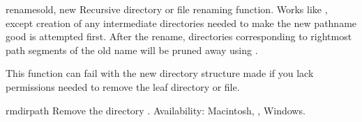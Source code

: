 \begin{funcdesc}{renames}{old, new}
Recursive directory or file renaming function.
Works like , except creation of any intermediate
directories needed to make the new pathname good is attempted first.
After the rename, directories corresponding to rightmost path segments
of the old name will be pruned away using .

\begin{notice}
This function can fail with the new directory structure made if
you lack permissions needed to remove the leaf directory or file.
\end{notice}
\end{funcdesc}

\begin{funcdesc}{rmdir}{path}
Remove the directory .
Availability: Macintosh, \UNIX, Windows.
\end{funcdesc}

